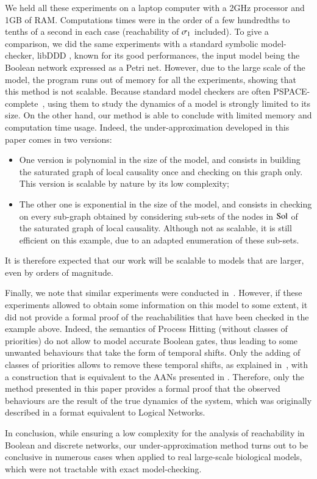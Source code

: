 We held all these experiments on a laptop computer with a 2GHz processor
and 1GB of RAM.
Computations times were in the order of a few hundredths to tenths of a second
in each case (reachability of $\sigma_1$ included).
To give a comparison, we did the same experiments with a standard symbolic model-checker, libDDD
\cite{libddd}, known for its good performances, the input model being the Boolean network expressed
as a Petri net.
However, due to the large scale of the model, the program runs out of memory for all the experiments,
showing that this method is not scalable.
Because standard model checkers are often PSPACE-complete~\cite{Harel02},
using them to study the dynamics of a model is strongly limited to its size.
On the other hand,
our method is able to conclude with limited memory and computation time usage.
Indeed, the under-approximation developed in this paper comes in two versions:
\begin{itemize}
  \item One version is polynomial in the size of the model,
    and consists in building the saturated graph of local causality once
    and checking  on this graph only.
    This version is scalable by nature by its low complexity;
  \item The other one is exponential in the size of the model,
    and consists in checking 
    on every sub-graph obtained by considering sub-sets of the nodes in $\mathrm{Sol}$
    of the saturated graph of local causality.
    Although not as scalable, it is still efficient on this example,
    due to an adapted enumeration of these sub-sets.%
\end{itemize}
It is therefore expected that our work will be scalable to models that are larger,
even by orders of magnitude.

Finally, we note that similar experiments were conducted in~\cite{PMR12-MSCS}.
However, if these experiments allowed to obtain some information
on this model to some extent,
it did not provide a formal proof of the reachabilities that have been
checked in the example above.
Indeed, the semantics of Process Hitting (without classes of priorities)
do not allow to model accurate Boolean gates,
thus leading to some unwanted behaviours that take the form of temporal shifts.
Only the adding of classes of priorities allows to remove these temporal shifts,
as explained in~\cite{FPMR13-CS2Bio},
with a construction that is equivalent to the AANs presented in .
Therefore, only the method presented in this paper provides a formal proof that
the observed behaviours are the result of the true dynamics of the system,
which was originally described in a format equivalent to Logical Networks.

In conclusion,
while ensuring a low complexity for the analysis of reachability in Boolean and discrete networks,
our under-approximation method turns out to be conclusive in numerous cases when applied to real
large-scale biological models, which were not tractable with exact model-checking.
